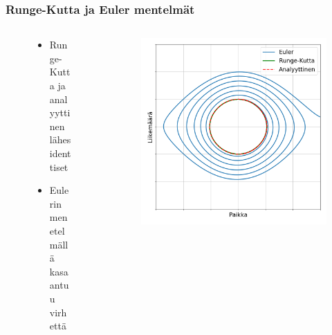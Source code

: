 \documentclass[finnish, 11pt, fleqn]{beamer}
\begin{document}
\begin{frame}
	\frametitle{Runge-Kutta ja Euler mentelmät}
	\begin{columns}[onlytextwidth]
		\begin{column}{.3\textwidth}
			\begin{figure}
				\vspace{-2.5em}
    			\begin{itemize}
    				\item{Runge-Kutta ja analyyttinen lähes identtiset}
    				\vspace{0.5em}
    				\item{Eulerin menetelmällä kasaantuu virhettä}
    			\end{itemize}
			\end{figure}
		\end{column}
		\hfill
		\begin{column}{.65\textwidth}
			\vspace{-1.5em}			
			\begin{figure}[h!]
				\includegraphics[scale=0.32]{graphics/comp2.png}
				\vspace{-2.5em}				
			\end{figure}
		\end{column}
	\end{columns}
\end{frame}
\end{document}
